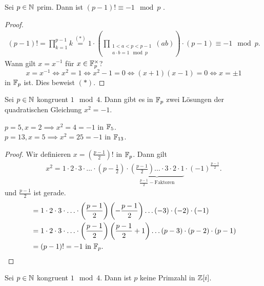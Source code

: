\begin{lemma}
	Sei $p \in \mathbb{N}$ prim. Dann ist $(p-1)! \equiv -1 \mod p$ .
\end{lemma}

\begin{proof}
	\begin{align*}
		(p-1)! = \prod_{k=1}^{p-1} k \stackrel{(*)}{=} 1 \cdot \left(\prod_{\substack{1 < a < p < p-1\\ a\cdot b = 1 \mod p}} (ab) \right) \cdot (p-1) \equiv -1 \mod p
	.\end{align*}
	Wann gilt $x = x^{-1}$ für $x \in \mathbb{F}_{p}^{\times}$? 
	\[
		x = x^{-1} \Leftrightarrow x^2 = 1 \Leftrightarrow x^2 -1 = 0 \Leftrightarrow (x+1)(x-1) = 0 \Leftrightarrow x = \pm 1
	\] 
	in $\mathbb{F}_{p}$ ist. Dies beweist $(*)$.
\end{proof}

\begin{proposition}
	Sei $p \in \mathbb{N}$ kongruent $1 \mod 4$.
	Dann gibt es in  $\mathbb{F}_{p}$ zwei Lösungen der quadratischen Gleichung $x^2 = -1$.
\end{proposition}

\begin{eg}
	$p = 5, x = 2 \implies x^2 = 4 = -1 $ in $\mathbb{F}_{5}$.\\
	$p = 13, x = 5 \implies x^2 = 25 = -1$ in $\mathbb{F}_{13}$.
\end{eg}

\begin{proof}
	Wir definieren $x = \left( \frac{p-1}{2} \right)!$ in $\mathbb{F}_{p}$.
	Dann gilt
	\begin{align*}
		x^2 = 1 \cdot 2 \cdot 3 \cdot \ldots \cdot \left(p-\frac{1}{2}\right) \cdot\underbrace{ \left( \frac{p-1}{2} \right) \ldots \cdot 3 \cdot 2 \cdot 1
		}_{\frac{p-1}{2} - \text{Faktoren}} \cdot (-1)^{\frac{p-1}{2}}
	.\end{align*}
	und $\frac{p-1}{2}$ ist gerade.
	\begin{align*}
		&= 1 \cdot 2 \cdot 3 \cdot \ldots \cdot  \left( \frac{p-1}{2} \right) \left( - \frac{p-1}{2} \right) \ldots (-3) \cdot (-2) \cdot (-1)\\
		&= 1 \cdot 2 \cdot 3 \cdot \ldots \cdot  \left( \frac{p-1}{2} \right) \left( \frac{p-1}{2} +1 \right) \ldots (p-3) \cdot (p-2) \cdot (p-1)\\
		&= (p-1)! = -1 \text{ in } \mathbb{F}_{p}
	.\end{align*}
\end{proof}

\begin{corollary}
	Sei $p \in \mathbb{N}$ kongruent $1 \mod 4$. Dann ist $p$ keine Primzahl in $\mathbb{Z}[i]$.
\end{corollary}

